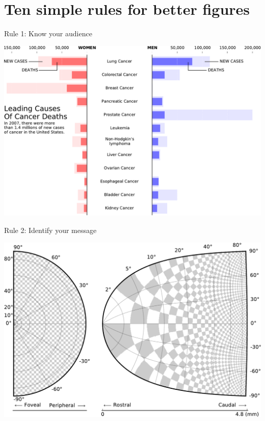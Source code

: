 \documentclass[10pt,aspectratio=169]{beamer}
\begin{document}


  
\section{Ten simple rules for better figures}

\begin{frame}{Rule 1: Know your audience}
  \begin{center}
    \includegraphics[width=.75\textwidth]{rule-1.pdf}
  \end{center} 
\end{frame}

\begin{frame}{Rule 2: Identify your message}
  \begin{center}
    \includegraphics[width=.75\textwidth]{rule-2.pdf}
  \end{center} 
\end{frame}
\end{document}
